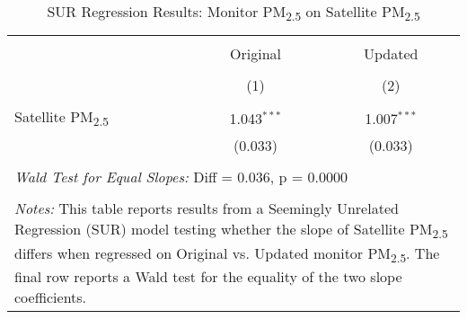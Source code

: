
\begin{table}[!htbp] \centering
  \caption{SUR Regression Results: Monitor PM\textsubscript{2.5} on Satellite PM\textsubscript{2.5}}
  \label{tab:sur_results}
\begin{tabular}{@{\extracolsep{5pt}}lcc}
\\[-1.8ex]\hline
\hline \\[-1.8ex]
& Original & Updated \\
\\[-1.8ex] & (1) & (2) \\
\hline \\[-1.8ex]
Satellite PM\textsubscript{2.5} & 1.043$^{***}$ & 1.007$^{***}$ \\
& (0.033) & (0.033) \\
\hline \\[-1.8ex]
\multicolumn{3}{l}{\textit{Wald Test for Equal Slopes:} Diff = 0.036, p = 0.0000} \\
\hline
\hline \\[-1.8ex]
\multicolumn{3}{p{0.85\textwidth}}{\textit{Notes:} This table reports results from a Seemingly Unrelated Regression (SUR) model testing whether the slope of Satellite PM\textsubscript{2.5} differs when regressed on Original vs. Updated monitor PM\textsubscript{2.5}. The final row reports a Wald test for the equality of the two slope coefficients.}
\end{tabular}
\end{table}
